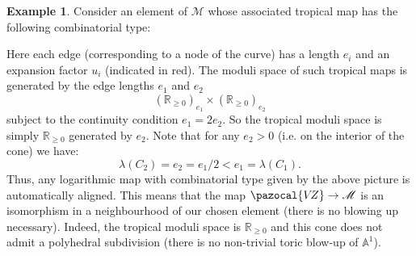 \documentclass[11pt]{amsart}
\newcommand{\mathsq}[1]{#1}
\newcommand{\PP}{\mathbb P}
\newcommand{\VZ}{\pazocal{V\!Z}}
\renewcommand{\to}{\rightarrow}
\newcommand{\Aaff}{\mathbb{A}}
\newcommand{\Mcal}{\mathcal{M}}
\newcommand{\RR}{\mathbb{R}}
\theoremstyle{definition}
\theoremstyle{definition}
\newtheorem{example}[thm]{Example}
\begin{document}
\begin{example} Consider an element of $\Mcal$ whose associated tropical map has the following combinatorial type:
\begin{center}
\end{center}
Here each edge (corresponding to a node of the curve) has a length $e_i$ and an expansion factor $u_i$ (indicated in red). The moduli space of such tropical maps is generated by the edge lengths $e_1$ and $e_2$
\begin{equation*} (\RR_{\geq 0})_{e_1} \times (\RR_{\geq 0})_{e_2} \end{equation*}
subject to the continuity condition $e_1=2e_2$. So the tropical moduli space is simply $\RR_{\geq 0}$ generated by $e_2$. Note that for any $e_2 > 0$ (i.e. on the interior of the cone) we have:
\begin{equation*} \lambda(\mathsq{C}_2) = e_2 = e_1/2 < e_1 = \lambda(\mathsq{C}_1). \end{equation*}
Thus, any logarithmic map with combinatorial type given by the above picture is automatically aligned. This means that the map $\VZ \to \Mcal$ is an isomorphism in a neighbourhood of our chosen element (there is no blowing up necessary). Indeed, the tropical moduli space is $\RR_{\geq 0}$ and this cone does not admit a polyhedral subdivision (there is no non-trivial toric blow-up of $\Aaff^1$).
\end{example}
\end{document}
